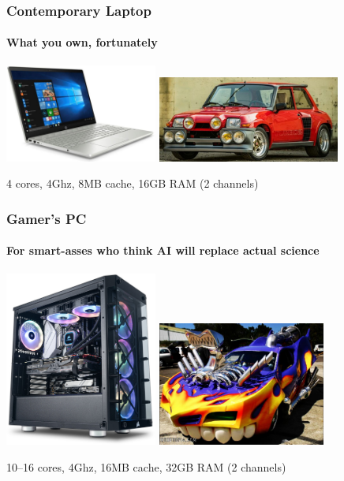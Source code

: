 \documentclass[xcolor={x11names,svgnames,psnames}]{beamer}
\begin{document}
\begin{frame}
  \frametitle{Contemporary Laptop}
  \framesubtitle{What you own, fortunately}
  
  \centering
  \includegraphics[width=5cm]{laptop}%
  \includegraphics[width=6cm]{r5maxi}

    \bigskip

  4 cores, 4Ghz, 8MB cache, 16GB RAM (2 channels)
\end{frame}


\begin{frame}
  \frametitle{Gamer's PC}
  \framesubtitle{For smart-asses who think AI will replace actual science}
  
  \centering
  \includegraphics[width=5cm]{gamer}%
  \hfill%
  \includegraphics[width=5.5cm]{tuning}

    \bigskip

    10--16 cores, 4Ghz, 16MB cache, 32GB RAM (2 channels)
\end{frame}
\end{document}
